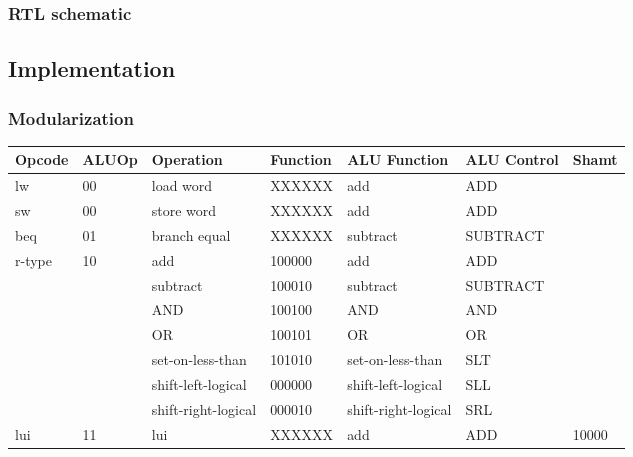 \subsubsection{RTL schematic}

\subsection{Implementation}

\subsubsection{Modularization}

\begin{table}
    \begin{tabular}{|l|l|l|l|l|l|l|}
    \hline
    Opcode & ALUOp & Operation           & Function & ALU Function        & ALU Control & Shamt   \\ \hline
    lw     & 00    & load word           & XXXXXX   & add                 & ADD         & \\ \hline
    sw     & 00    & store word          & XXXXXX   & add                 & ADD         & \\ \hline
    beq    & 01    & branch equal        & XXXXXX   & subtract            & SUBTRACT    & \\ \hline
    r-type & 10    & add                 & 100000   & add                 & ADD         & \\ \cline{3-7}
           &       & subtract            & 100010   & subtract            & SUBTRACT    & \\ \cline{3-7}
           &       & AND                 & 100100   & AND                 & AND         & \\ \cline{3-7}
           &       & OR                  & 100101   & OR                  & OR          & \\ \cline{3-7}
           &       & set-on-less-than    & 101010   & set-on-less-than    & SLT         & \\ \cline{3-7}
           &       & shift-left-logical  & 000000   & shift-left-logical  & SLL         & \\ \cline{3-7}
           &       & shift-right-logical & 000010   & shift-right-logical & SRL         & \\ \hline
    lui    & 11    & lui                 & XXXXXX   & add                 & ADD         & 10000 \\ \hline
    \end{tabular}
\end{table}

